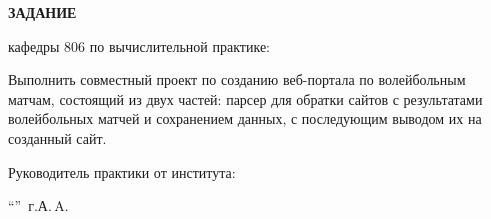 \begin{center}
\bfseries{\large ЗАДАНИЕ}
\end{center}

кафедры 806 по вычислительной практике:

Выполнить совместный проект по созданию веб-портала по волейбольным матчам, состоящий из двух частей: парсер для обратки сайтов с результатами волейбольных матчей и сохранением данных, с последующим выводом их на созданный сайт.

\vspace*{\fill}
Руководитель практики от института:

\vspace{5pt}
\enquote{\hspace{0.5cm}}  \the\year\,г. А.\,A. 
\pagebreak
